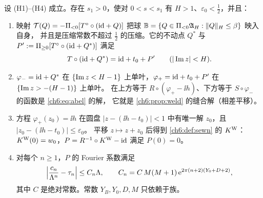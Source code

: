 \begin{theorem}[缝合定理]\label{thm:sewing}
设 \textup{(H1)--(H4)} 成立。存在 $s_1>0$，使对 $0<s<s_1$ 有 $H>1$、$\varepsilon_0<\tfrac12$，并且：
\begin{enumerate}
\item 映射 $\mathcal T(Q)=-\Pi_{<0}[T^{\circ}\circ(\mathrm{id}+Q)]$ 把球 $\mathbb B=\{Q\in\Pi_{<0}\mathfrak A_H:\|Q\|_H\le\beta\}$ 映入自身，
 并且是压缩常数不超过 $\tfrac12$ 的压缩。它的不动点 $Q^*$ 与 $P':=\Pi_{\ge 0}[T^{\circ}\circ(\mathrm{id}+Q^*)]$ 满足
 \begin{equation}\label{ch6:eq:seam}
  T\circ(\mathrm{id}+Q^*)=\mathrm{id}+t_0+P'\qquad(|\operatorname{Im} z|<H).
 \end{equation}
\item $\varphi_-=\mathrm{id}+Q^*$ 在 $\{\operatorname{Im} z<H-1\}$ 上单叶，$\varphi_+=\mathrm{id}+t_0+P'$ 在 $\{\operatorname{Im} z>-(H-1)\}$ 上单叶。
 在上方等于 $R\circ(\varphi_+-\ii h)$、下方等于 $S\circ\varphi_-$ 的函数是 \eqref{ch6:eq:abel} 的解，
 它就是 \cref{ch6:prop:weld} 的缝合解（相差平移）。
\item 方程 $\varphi_+(z_0)=\ii h$ 在圆盘 $|z-(\ii h-t_0)|<1$ 中有唯一解 $z_0$，且 $|z_0-(\ii h-t_0)|\le\varepsilon_0$。
 平移 $z\mapsto z+z_0$ 后得到 \cref{ch6:def:sewn} 的 $K^{\mathrm W}$：$K^{\mathrm W}(0)=w_0$，$P=R^{-1}\circ K^{\mathrm W}-\mathrm{id}$ 满足 $P(0)=0$。
\item 对每个 $n\ge1$，$P$ 的 Fourier 系数满足
 \[
  \Bigl|\frac{c_n}{\Lambda^n}-\tau_n\Bigr|\le C_n\Lambda,\qquad C_n=C\,M(M+1)\,\mathrm{e}^{2\pi(n+2)(Y_0+D+2)},
 \]
 其中 $C$ 是绝对常数。常数 $Y_B,Y_0,D,M$ 只依赖于族。
\end{enumerate}
\end{theorem}

